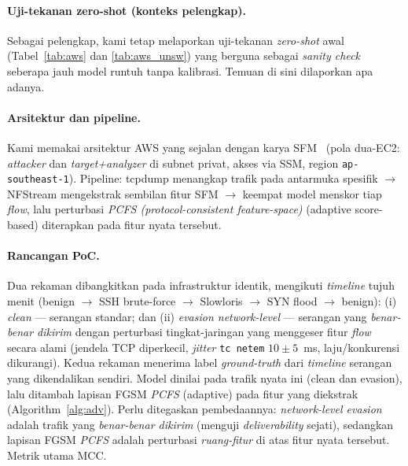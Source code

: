 \documentclass[11pt,a4paper]{article}
\begin{document}
\paragraph{Uji-tekanan zero-shot (konteks pelengkap).} Sebagai pelengkap, kami tetap
melaporkan uji-tekanan \emph{zero-shot} awal (Tabel~\ref{tab:aws} dan
\ref{tab:aws_unsw}) yang berguna sebagai \emph{sanity check} seberapa jauh model
runtuh tanpa kalibrasi. Temuan di sini dilaporkan apa adanya.

\paragraph{Arsitektur dan pipeline.} Kami memakai arsitektur AWS yang sejalan
dengan karya SFM~\cite{martono2024sfm} (pola dua-EC2: \emph{attacker} dan
\emph{target+analyzer} di subnet privat, akses via SSM, region
\texttt{ap-southeast-1}). Pipeline: tcpdump menangkap trafik pada antarmuka
spesifik $\rightarrow$ NFStream mengekstrak sembilan fitur SFM $\rightarrow$ keempat
model menskor tiap \emph{flow}, lalu perturbasi \emph{PCFS (protocol-consistent
feature-space)} (adaptive score-based) diterapkan pada fitur nyata tersebut.

\paragraph{Rancangan PoC.} Dua rekaman dibangkitkan pada infrastruktur identik,
mengikuti \emph{timeline} tujuh menit (benign $\rightarrow$ SSH brute-force
$\rightarrow$ Slowloris $\rightarrow$ SYN flood $\rightarrow$ benign):
(i) \emph{clean} --- serangan standar; dan (ii) \emph{evasion network-level} ---
serangan yang \emph{benar-benar dikirim} dengan perturbasi tingkat-jaringan yang
menggeser fitur \emph{flow} secara alami (jendela TCP diperkecil, \emph{jitter}
\texttt{tc netem} $10\pm5$~ms, laju/konkurensi dikurangi). Kedua rekaman menerima
label \emph{ground-truth} dari \emph{timeline} serangan yang dikendalikan sendiri.
Model dinilai pada trafik nyata ini (clean dan evasion), lalu ditambah lapisan
FGSM \emph{PCFS} (adaptive) pada fitur yang diekstrak (Algorithm~\ref{alg:adv}).
Perlu ditegaskan pembedaannya: \emph{network-level evasion} adalah trafik yang
\emph{benar-benar dikirim} (menguji \emph{deliverability} sejati), sedangkan lapisan
FGSM \emph{PCFS} adalah perturbasi \emph{ruang-fitur} di atas fitur nyata tersebut.
Metrik utama MCC.
\end{document}
